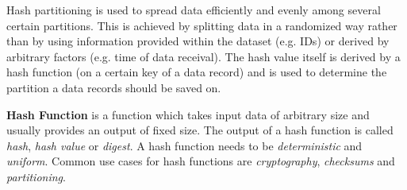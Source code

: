 {\newpage

\label{tf_dds_partitioning_key_value_hash_of_key}
Hash partitioning is used to spread data efficiently and evenly among several certain partitions. This is achieved by splitting data in a randomized way rather than by using information provided within the dataset (e.g. IDs) or derived by arbitrary factors (e.g. time of data receival). The hash value itself is derived by a hash function (on a certain key of a data record) and is used to determine the partition a data records should be saved on.
\\[0.5 cm]
\hspace*{4mm}%
\hspace*{4mm}%
\begin{minipage}{0.8\textwidth}\raggedright
\textbf{Hash Function} is a function which takes input data of arbitrary size and usually provides an output of fixed size. The output of a hash function is called \textit{hash}, \textit{hash value} or \textit{digest}. A hash function needs to be \textit{deterministic} and \textit{uniform}. Common use cases for hash functions are \textit{cryptography}, \textit{checksums} and \textit{partitioning}.\\
\end{minipage}\\[0.4 cm]

}
